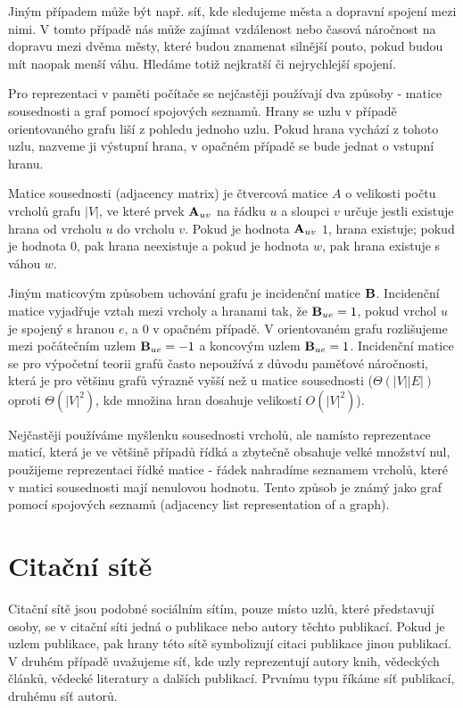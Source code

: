 \documentclass{bakalarka}
\begin{document}
Jiným případem může být např. síť, kde sledujeme města a dopravní spojení
mezi nimi. V tomto případě nás může zajímat vzdálenost nebo časová náročnost
na dopravu mezi dvěma městy, které budou znamenat silnější pouto, pokud budou
mít naopak menší váhu. Hledáme totiž nejkratší či nejrychlejší spojení.


Pro reprezentaci v paměti počítače se nejčastěji používají dva způsoby - matice
sousednosti a graf pomocí spojových seznamů.  Hrany se uzlu v případě
orientovaného grafu liší z pohledu jednoho uzlu. Pokud hrana vychází z tohoto
uzlu, nazveme ji výstupní hrana, v opačném případě se bude jednat o vstupní
hranu.


Matice sousednosti (adjacency matrix) je čtvercová matice $A$ o velikosti počtu
vrcholů grafu $|V|$, ve které prvek ${\bf A}_{uv}$ na řádku $u$ a sloupci $v$
určuje jestli existuje hrana od vrcholu $u$ do vrcholu $v$. Pokud je hodnota
${\bf A}_{uv}$ $1$, hrana existuje; pokud je hodnota $0$, pak hrana neexistuje
a pokud je hodnota $w$, pak hrana existuje s váhou $w$.

Jiným maticovým způsobem uchování grafu je incidenční matice ${\bf B}$.
Incidenční matice vyjadřuje vztah mezi vrcholy a hranami tak, že ${\bf B}_{ue}
= 1$, pokud vrchol $u$ je spojený s hranou $e$, a $0$ v opačném případě. V
orientovaném grafu rozlišujeme mezi počátečním uzlem ${\bf B}_{ue} = -1$ a
koncovým uzlem ${\bf B}_{ue} = 1$. Incidenční matice se pro výpočetní teorii
grafů často nepoužívá z důvodu paměťové náročnosti, která je pro většinu grafů
výrazně vyšší než u matice sousednosti ($\Theta(|V||E|)$ oproti
$\Theta(|V|^2)$, kde množina hran dosahuje velikostí $O(|V|^2)$).

Nejčastěji používáme myšlenku sousednosti vrcholů, ale namísto reprezentace
maticí, která je ve většině případů řídká a zbytečně obsahuje velké množství
nul, použijeme reprezentaci řídké matice - řádek nahradíme seznamem vrcholů,
které v matici sousednosti mají nenulovou hodnotu. Tento způsob je známý jako
graf pomocí spojových seznamů (adjacency list representation of a graph).


\section{Citační sítě}
Citační sítě jsou podobné sociálním sítím, pouze místo uzlů, které představují
osoby, se v citační síti jedná o publikace nebo autory těchto publikací. Pokud
je uzlem publikace, pak hrany této sítě symbolizují citaci publikace jinou
publikací. V druhém případě uvažujeme síť, kde uzly reprezentují autory knih,
vědeckých článků, vědecké literatury a dalších publikací. Prvnímu typu říkáme
síť publikací, druhému síť autorů.
\end{document}
